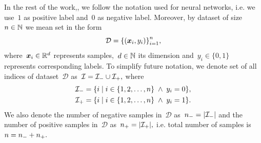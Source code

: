 \begin{notation}[Dataset]\label{not: dataset}
  In the rest of the work,, we follow the notation used for neural networks, i.e. we use~$1$ as positive label and~$0$ as negative label. Moreover, by dataset of size~$n \in \mathbb{N}$ we mean set in the form
  \begin{equation*}
    \mathcal{D} = \Brac[c]{(\bm{x}_i, y_i)}_{i=1}^{n},
  \end{equation*}
  where~$\bm{x}_i \in \mathbb{R}^d$ represents samples,~$d \in \mathbb{N}$ its dimension and~$y_i \in \{0, 1\}$ represents corresponding labels. To simplify future notation, we denote set of all indices of dataset~$\mathcal{D}$ as~$\mathcal{I} = \mathcal{I}_{-} \cup \mathcal{I}_{+},$ where
  \begin{equation*}
    \begin{aligned}
      \Ineg & = \Set{i}{i \in \{1, 2, \ldots, n\} \; \land \; y_i = 0}, \\
      \Ipos & = \Set{i}{i \in \{1, 2, \ldots, n\} \; \land \; y_i = 1}.
    \end{aligned}
  \end{equation*}
  We also denote the number of negative samples in~$\mathcal{D}$ as~$\nneg = \Brac[v]{\Ineg}$ and the number of positive samples in~$\mathcal{D}$ as~$\npos = \Brac[v]{\Ipos},$ i.e. total number of samples is~$n = n_{-} + n_{+}.$ 
\end{notation}

